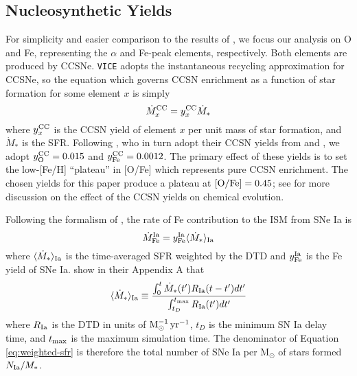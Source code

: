 \documentclass[twocolumn,twocolappendix,linenumbers,trackchanges]{aastex631}
\newcommand{\vice}{{\tt VICE}\xspace}
\begin{document}
\subsection{Nucleosynthetic Yields}
\label{sec:yields}

For simplicity and easier comparison to the results of , we focus our analysis on O and Fe, representing the $\alpha$ and Fe-peak elements, respectively. Both elements are produced by CCSNe. \vice adopts the instantaneous recycling approximation for CCSNe, so the equation which governs CCSN enrichment as a function of star formation for some element $x$ is simply
\begin{equation}
    \dot M_x^{\rm CC} = y_x^{\rm CC} \dot M_*
    \label{eq:ccsn-enrichment}
\end{equation}
where $y_x^{\rm CC}$ is the CCSN yield of element $x$ per unit mass of star formation, and $\dot M_*$ is the SFR. 
Following , who in turn adopt their CCSN yields from \citet{ChieffiLimongi2004-CCSNYields} and \citet{LimongiChieffi2006-CCSNYields}, we adopt $y_{\rm O}^{\rm CC}=0.015$ and $y_{\rm Fe}^{\rm CC}=0.0012$. The primary effect of these yields is to set the low-[Fe/H] ``plateau'' in [O/Fe] which represents pure CCSN enrichment. The chosen yields for this paper produce a plateau at ${\rm [O/Fe]}=0.45$; see \citet{Weinberg2023-CCSNYield} for more discussion on the effect of the CCSN yields on chemical evolution.

Following the formalism of \citet{Weinberg2017-ChemicalEquilibrium}, the rate of Fe contribution to the ISM from SNe Ia is 
\begin{equation}
    \dot M_{\rm Fe}^{\rm Ia} = y_{\rm Fe}^{\rm Ia} \langle \dot M_*\rangle_{\rm Ia} \\
\end{equation}
where $\langle \dot M_*\rangle_{\rm Ia}$ is the time-averaged SFR weighted by the DTD and $y_{\rm Fe}^{\rm Ia}$ is the Fe yield of SNe Ia. \citet{Weinberg2017-ChemicalEquilibrium} show in their Appendix A that
\begin{equation}
    \langle \dot M_*\rangle_{\rm Ia} \equiv \frac{\int_0^t \dot M_*(t')R_{\rm Ia}(t-t')dt'}{\int_{t_D}^{t_{\rm max}} R_{\rm Ia}(t')dt'}
    \label{eq:weighted-sfr}
\end{equation}
where %
$R_{\rm Ia}$ is the DTD in units of ${\rm M}_\odot^{-1}\,{\rm yr}^{-1}$,
$t_D$ is the minimum SN Ia delay time, and $t_{\rm max}$ is the maximum simulation time. The denominator of Equation \ref{eq:weighted-sfr} is therefore the total number of SNe Ia per M$_{\odot}$ of stars formed $N_{\rm Ia}/M_*$.
\end{document}
